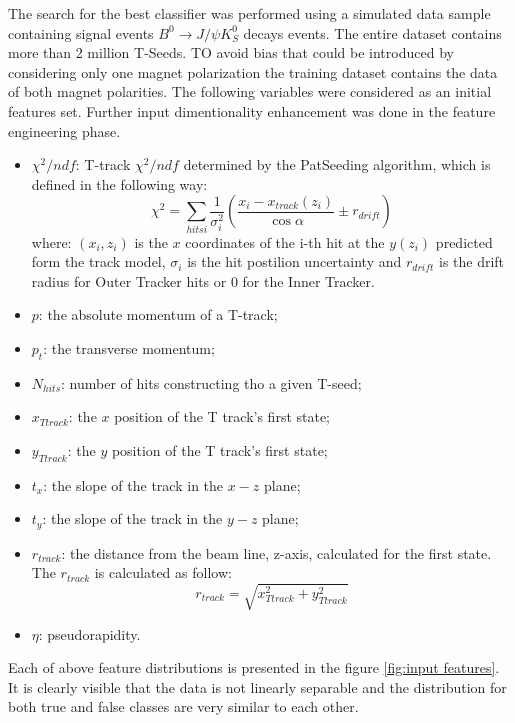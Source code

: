 The search for the best classifier was performed using a simulated data sample containing signal events $B^0\rightarrow J/\psi K_S^0 $ decays events. The entire dataset contains more than 2 million T-Seeds. TO avoid bias that could be introduced by considering only one magnet polarization the training dataset contains the data of both magnet polarities.  
The following variables were considered as an initial features set. Further input dimentionality enhancement was done in the feature engineering phase. 

\begin{itemize}
    \item $\chi^2/ndf$: T-track $\chi^2/ndf$ determined by the PatSeeding algorithm, which is defined in the following way: 
    \begin{equation}
        \chi^2 = \sum_{hits i} \frac{1}{\sigma_i^2} \left( \frac{x_i-x_{track}(z_i)}{\cos \alpha} \pm r_{drift} \right) 
    \end{equation}
    where: $(x_i, z_i)$ is the $x$ coordinates of the i-th hit at the $y(z_i)$ predicted form the track model, $\sigma_i$ is the hit postilion uncertainty and $r_{drift}$ is the drift radius for Outer Tracker hits or 0 for the Inner Tracker. 
    \item $p$: the absolute momentum of a T-track; 
    \item $p_t$: the transverse momentum;
    \item $N_{hits}$: number of hits constructing tho a given T-seed;
    \item $x_{T track}$: the $x$ position of the T track's first state; 
    \item $y_{T track}$: the $y$ position of the T track's first state;
    \item $t_x$: the slope of the track in the $x-z$ plane;
    \item $t_y$: the slope of the track in the $y-z$ plane;
    \item $r_{track}$: the distance from the beam line, z-axis, calculated for the first state. The $r_{track}$ is calculated as follow:
    \begin{equation}
        r_{track} = \sqrt{x_{T track}^2 + y_{T track}^2}
    \end{equation}
    \item $\eta$: pseudorapidity. 
\end{itemize}
Each of above feature distributions is presented in the figure \ref{fig:input features}. It is clearly visible that the data is not linearly separable and the distribution for both true and false classes are very similar to each other. 

